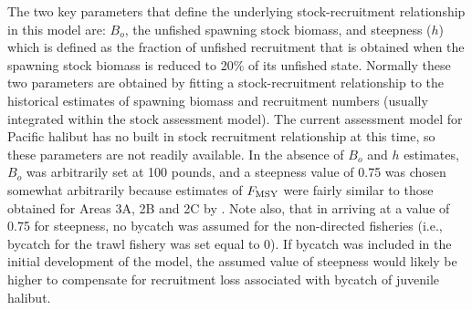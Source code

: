 The two key parameters that define the underlying stock-recruitment relationship in this model are: $B_o$, the unfished spawning stock biomass, and steepness ($h$) which is defined as the fraction of unfished recruitment that is obtained when the spawning stock biomass is reduced to 20\% of its unfished state.  Normally these two parameters are obtained by fitting a stock-recruitment relationship to the historical estimates of spawning biomass and recruitment numbers (usually integrated within the stock assessment model).  The current assessment model for Pacific halibut has no built in stock recruitment relationship at this time, so these parameters are not readily available.  In the absence of $B_o$ and $h$ estimates, $B_o$ was arbitrarily set at 100 pounds,  and a steepness value of 0.75 was chosen somewhat arbitrarily because estimates of $F_{\rm{MSY}}$ were fairly similar to those obtained for Areas 3A, 2B and 2C by \cite{clark2006assessment}.  Note also, that in arriving at a value of 0.75 for steepness, no  bycatch was assumed for the non-directed fisheries (i.e., bycatch for the trawl fishery was set equal to 0).  If bycatch was included in the initial development of the model, the assumed value of steepness would likely be higher to compensate for recruitment loss associated with bycatch of juvenile halibut.



